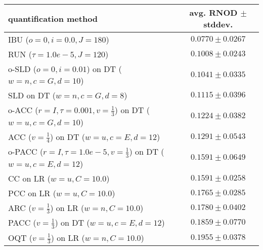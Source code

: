 \begin{tabular}{lc}
  \toprule
  quantification method & avg. RNOD $\pm$ stddev. \\
  \midrule
  IBU ($o=0, i=0.0, J=180$) & $\mathbf{0.0770 \pm 0.0267}$ \\
  RUN ($\tau=1.0e-5, J=120$) & $0.1008 \pm 0.0243$ \\
  o-SLD ($o=0, i=0.01$) on DT ($w=n, c=G, d=10$) & $0.1041 \pm 0.0335$ \\
  SLD on DT ($w=n, c=G, d=8$) & $0.1115 \pm 0.0396$ \\
  o-ACC ($r=I, \tau=0.001, v=\frac{1}{3}$) on DT ($w=u, c=G, d=10$) & $0.1224 \pm 0.0382$ \\
  ACC ($v=\frac{1}{4}$) on DT ($w=u, c=E, d=12$) & $0.1291 \pm 0.0543$ \\
  o-PACC ($r=I, \tau=1.0e-5, v=\frac{1}{3}$) on DT ($w=u, c=E, d=12$) & $0.1591 \pm 0.0649$ \\
  CC on LR ($w=u, C=10.0$) & $0.1591 \pm 0.0258$ \\
  PCC on LR ($w=u, C=10.0$) & $0.1765 \pm 0.0285$ \\
  ARC ($v=\frac{1}{3}$) on LR ($w=n, C=10.0$) & $0.1780 \pm 0.0402$ \\
  PACC ($v=\frac{1}{3}$) on DT ($w=u, c=E, d=12$) & $0.1859 \pm 0.0770$ \\
  OQT ($v=\frac{1}{3}$) on LR ($w=n, C=10.0$) & $0.1955 \pm 0.0378$ \\
  \bottomrule
\end{tabular}
